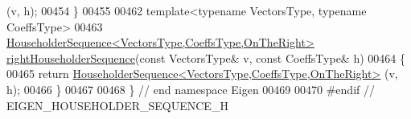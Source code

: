 \begin{DoxyCode}
      (v, h);
00454 \}
00455 
00462 \textcolor{keyword}{template}<\textcolor{keyword}{typename} VectorsType, \textcolor{keyword}{typename} CoeffsType>
00463 \hyperlink{group___householder___module_class_eigen_1_1_householder_sequence}{HouseholderSequence<VectorsType,CoeffsType,OnTheRight>}
       \hyperlink{group___householder___module_ga59f16274f9e66f902f1a4b3f23e8b002}{rightHouseholderSequence}(\textcolor{keyword}{const} VectorsType& v, \textcolor{keyword}{const} CoeffsType& h)
00464 \{
00465   \textcolor{keywordflow}{return} \hyperlink{group___householder___module_class_eigen_1_1_householder_sequence}{HouseholderSequence<VectorsType,CoeffsType,OnTheRight>}
      (v, h);
00466 \}
00467 
00468 \} \textcolor{comment}{// end namespace Eigen}
00469 
00470 \textcolor{preprocessor}{#endif // EIGEN\_HOUSEHOLDER\_SEQUENCE\_H}
\end{DoxyCode}
